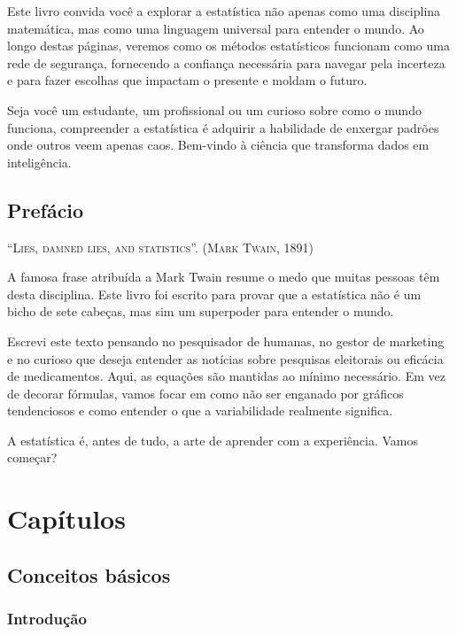 \documentclass[
  letterpaper,
]{book}
\begin{document}
Este livro convida você a explorar a estatística não apenas como uma
disciplina matemática, mas como uma linguagem universal para entender o
mundo. Ao longo destas páginas, veremos como os métodos estatísticos
funcionam como uma rede de segurança, fornecendo a confiança necessária
para navegar pela incerteza e para fazer escolhas que impactam o
presente e moldam o futuro.

Seja você um estudante, um profissional ou um curioso sobre como o mundo
funciona, compreender a estatística é adquirir a habilidade de enxergar
padrões onde outros veem apenas caos. Bem-vindo à ciência que transforma
dados em inteligência.


\chapter*{Prefácio}\label{prefuxe1cio}


\textsc{``Lies, damned lies, and statistics''. (Mark Twain, 1891)}

A famosa frase atribuída a Mark Twain resume o medo que muitas pessoas
têm desta disciplina. Este livro foi escrito para provar que a
estatística não é um bicho de sete cabeças, mas sim um superpoder para
entender o mundo.

Escrevi este texto pensando no pesquisador de humanas, no gestor de
marketing e no curioso que deseja entender as notícias sobre pesquisas
eleitorais ou eficácia de medicamentos. Aqui, as equações são mantidas
ao mínimo necessário. Em vez de decorar fórmulas, vamos focar em como
não ser enganado por gráficos tendenciosos e como entender o que a
variabilidade realmente significa.

A estatística é, antes de tudo, a arte de aprender com a experiência.
Vamos começar?

\part{Capítulos}

\chapter{Conceitos básicos}\label{conceitos-buxe1sicos}

\section{Introdução}\label{sec-intro}
\end{document}

